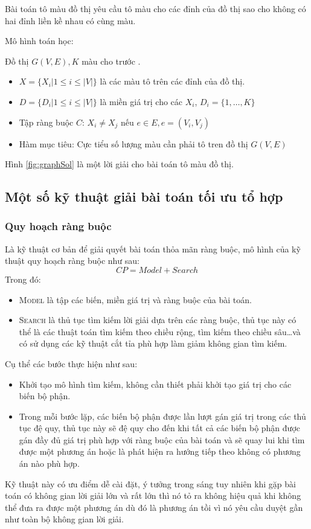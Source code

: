 Bài toán tô màu đồ thị yêu cầu tô màu cho các đỉnh của đồ thị sao cho không có hai đỉnh liền kề nhau có cùng màu.

Mô hình toán học:

Đồ thị $G(V,E), K$ màu cho trước \nocite{b2d1}.
\begin{itemize}
	\item $X = \{X_i | 1 \leq i \leq |V|\}$ \quad là các màu tô trên các đỉnh của đồ thị.
	\item $D = \{D_i | 1 \leq i \leq |V|\}$ \quad là miền giá trị cho các $X_i$, $D_i = \{1,\dots,K\}$
	\item Tập ràng buộc $C$:
	$X_i \neq X_j$ nếu \exists $e \in E, e = (V_i, V_j)$
	\item Hàm mục tiêu:
	Cực tiểu số lượng màu cần phải tô tren đồ thị $G(V,E)$ 
\end{itemize}

Hình \ref{fig:graphSol} là một lời giải cho bài toán tô màu đồ thị.

\subsection{Một số kỹ thuật giải bài toán tối ưu tổ hợp}
\subsubsection*{Quy hoạch ràng buộc \cite{rossi2006handbookOfCp, pascal2005cp}}
Là kỹ thuật cơ bản để giải quyết bài toán thỏa mãn ràng buộc, mô hình của kỹ thuật quy hoạch ràng buộc như sau: 
\[ CP = Model + Search\]
Trong đó:
\begin{itemize}
	\item \textsc{Model} là tập các biến, miền giá trị và ràng buộc của bài toán.
	\item \textsc{Search} là thủ tục tìm kiếm lời giải dựa trên các ràng buộc, thủ tục này có thể là các thuật toán tìm kiếm theo chiều rộng, tìm kiếm theo chiều sâu\dots và có sử dụng các kỹ thuật cắt tỉa phù hợp làm giảm không gian tìm kiếm.
\end{itemize}

Cụ thể các bước thực hiện như sau:
\begin{itemize}
	\item Khởi tạo mô hình tìm kiếm, không cần thiết phải khởi tạo giá trị cho các biến bộ phận.
	\item Trong mỗi bước lặp, các biến bộ phận được lần lượt gán giá trị trong các thủ tục đệ quy, thủ tục này sẽ đệ quy cho đến khi tất cả các biến bộ phận được gán đầy đủ giá trị phù hợp với ràng buộc của bài toán và sẽ quay lui khi tìm được một phương án hoặc là phát hiện ra hướng tiếp theo không có phương án nào phù hợp.
\end{itemize}
Kỹ thuật này có ưu điểm dễ cài đặt, ý tưởng trong sáng tuy nhiên khi gặp bài toán có không gian lời giải lớn và rất lớn thì nó tỏ ra không hiệu quả khi không thể đưa ra được một phương án dù đó là phương án tồi vì nó yêu cầu duyệt gần như toàn bộ không gian lời giải.
